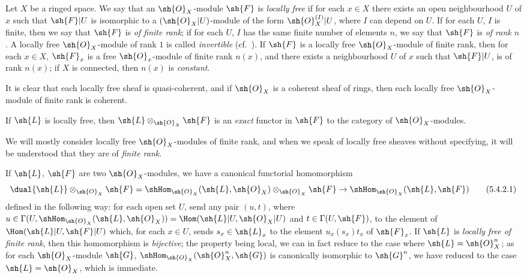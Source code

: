 \begin{env}[5.4.1]
\label{0.5.4.1}
Let $X$ be a ringed space.
We say that an $\sh{O}_X$-module $\sh{F}$ is \emph{locally free} if for each $x\in X$ there exists an open neighbourhood $U$ of $x$ such that $\sh{F}|U$ is isomorphic to a $(\sh{O}_X|U)$-module of the form $\sh{O}_X^{(I)}|U$, where $I$ can depend on $U$.
If for each $U$, $I$ is finite, then we say that $\sh{F}$ is \emph{of finite rank};
if for each $U$, $I$ has the same finite number of elements $n$, we say that $\sh{F}$ is \emph{of rank $n$}.
A locally free $\sh{O}_X$-module of rank $1$ is called \emph{invertible} (cf.~).
If $\sh{F}$ is a locally free $\sh{O}_X$-module of finite rank, then for each $x\in X$, $\sh{F}_x$ is a free $\sh{O}_x$-module of finite rank $n(x)$, and there exists a neighbourhood $U$ of $x$ such that $\sh{F}|U$, is of rank $n(x)$;
if $X$ is connected, then $n(x)$ is \emph{constant}.

It is clear that each locally free sheaf is quasi-coherent, and if $\sh{O}_X$ is a coherent sheaf of rings, then each locally free $\sh{O}_X$-module of finite rank is coherent.

If $\sh{L}$ is locally free, then $\sh{L}\otimes_{\sh{O}_X}\sh{F}$ is an \emph{exact} functor in $\sh{F}$ to the category of $\sh{O}_X$-modules.

We will mostly consider locally free $\sh{O}_X$-modules of finite rank,
and when we speak of locally free sheaves without specifying, it will be understood that they are of \emph{finite rank}.

\end{env}

\begin{env}[5.4.2]
\label{0.5.4.2}
If $\sh{L}$, $\sh{F}$ are two $\sh{O}_X$-modules, we have a canonical functorial homomorphism
\[
  \dual{\sh{L}}\otimes_{\sh{O}_X}\sh{F}=\shHom_{\sh{O}_X}(\sh{L},\sh{O}_X)\otimes_{\sh{O}_X}\sh{F}\to\shHom_{\sh{O}_X}(\sh{L},\sh{F})
  \tag{5.4.2.1}
\]
defined in the following way:
for each open set $U$, send any pair $(u,t)$, where $u\in\Gamma(U,\shHom_{\sh{O}_X}(\sh{L},\sh{O}_X))=\Hom(\sh{L}|U,\sh{O}_X|U)$ and $t\in\Gamma(U,\sh{F})$, to the element of $\Hom(\sh{L}|U,\sh{F}|U)$ which, for each $x\in U$, sends $s_x\in\sh{L}_x$ to the element $u_x(s_x)t_x$ of $\sh{F}_x$.
If $\sh{L}$ is \emph{locally free of finite rank}, then this homomorphism is \emph{bijective};
the property being local, we can in fact reduce to the case where $\sh{L}=\sh{O}_X^n$;
as for each $\sh{O}_X$-module $\sh{G}$, $\shHom_{\sh{O}_X}(\sh{O}_X^n,\sh{G})$ is canonically isomorphic to $\sh{G}^n$, we have reduced to the case $\sh{L}=\sh{O}_X$, which is immediate.
\end{env}

